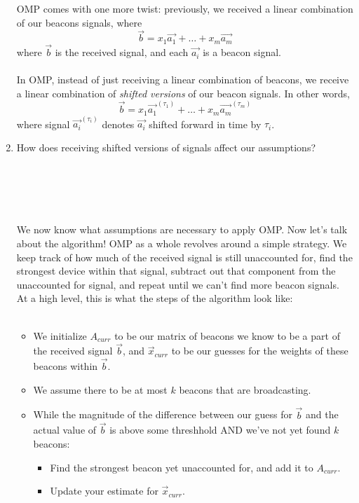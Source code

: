 \begin{enumerate}
    OMP comes with one more twist: previously, we received a linear combination of our beacons signals, where
    $$ \vec{b} = x_1\vec{a_1} + \dots + x_m\vec{a_m} $$
    where $\vec{b}$ is the received signal, and each $\vec{a_i}$ is a beacon signal.
    \\ \\
    In OMP, instead of just receiving a linear combination of beacons, we receive a linear
    combination of \textit{shifted versions} of our beacon signals. In other words,
    $$ \vec{b} = x_1\vec{a_1}^{(\tau_1)} + \dots + x_m\vec{a_m}^{(\tau_m)} $$
    where signal $\vec{a_i}^{(\tau_i)}$ denotes $\vec{a_i}$ shifted forward in time by $\tau_i$.
    \item How does receiving shifted versions of signals affect our assumptions?
    \\ \\
    \answerbox{0.5cm}
    \\ \\
    \\ \\
    We now know what assumptions are necessary to apply OMP. Now let's talk about the algorithm!
    OMP as a whole revolves around a simple strategy. We keep track of how much of the received signal is
    still unaccounted for, find the strongest device within that signal, subtract out that component from
    the unaccounted for signal, and repeat until we can't find more beacon signals.
    At a high level, this is what the steps of the algorithm look like:
    \\ \\
    \begin{itemize}
        \item We initialize $A_{curr}$ to be our matrix of beacons we know to be a part of the received signal $\vec{b}$,
        and $\vec{x}_{curr}$ to be our guesses for the weights of these beacons within $\vec{b}$.
        \item We assume there to be at most $k$ beacons that are broadcasting.
        \item While the magnitude of the difference between our guess for $\vec{b}$ and the actual value of $\vec{b}$ is
        above some threshhold AND we've not yet found $k$ beacons:
        \begin{itemize}
            \item Find the strongest beacon yet unaccounted for, and add it to $A_{curr}$.
            \item Update your estimate for $\vec{x}_{curr}$.
        \end{itemize}
    \end{itemize}


\end{enumerate}

